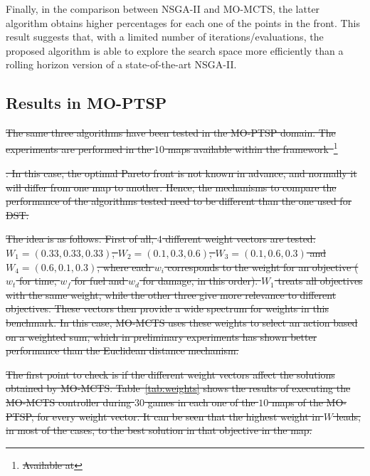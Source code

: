 \documentclass[journal]{IEEEtran}
\providecommand{\DIFdeltex}[1]{{\protect\color{red}\sout{#1}}}                      %
\providecommand{\DIFdelbegin}{} %
\providecommand{\DIFdel}[1]{\texorpdfstring{\DIFdeltex{#1}}{}} %
\begin{document}
Finally, in the comparison between NSGA-II and MO-MCTS, the latter algorithm obtains higher percentages for each one of the points in the front. This result suggests that, with a limited number of iterations/evaluations, the proposed algorithm is able to explore the search space more efficiently than a rolling horizon version of a state-of-the-art NSGA-II.


\subsection{Results in MO-PTSP} \label{ssec:resMOPTSP}

\DIFdelbegin \DIFdel{The same three algorithms have been tested in the MO-PTSP domain. The experiments are performed in the $10$ maps available within the framework~}\footnote{\DIFdel{Available at }%
}%
\addtocounter{footnote}{-1}%
\DIFdel{. In this case, the optimal Pareto front is not known in advance, and normally it will differ from one map to another. Hence, the mechanisms to compare the performance of the algorithms tested need to be different than the one used for DST.
}%

\DIFdel{The idea is as follows. First of all, $4$ different weight vectors are tested: $W_1 = (0.33,0.33,0.33)$, $W_2 = (0.1,0.3,0.6)$, $W_3 = (0.1,0.6,0.3)$ and $W_4 = (0.6,0.1,0.3)$, where each $w_i$ corresponds to the weight for an objective ($w_t$ for time, $w_f$ for fuel and $w_d$ for damage, in this order). $W_1$ treats all objectives with the same weight, while the other three give more relevance to different objectives. These vectors then provide a wide spectrum for weights in this benchmark. In this case, MO-MCTS uses these weights to select an action based on a weighted sum, which in preliminary experiments has shown better performance than the Euclidean distance mechanism.
}%

\DIFdel{The first point to check is if the different weight vectors affect the solutions obtained by MO-MCTS. Table~\ref{tab:weights} shows the results of executing the MO-MCTS controller during $30$ games in each one of the $10$ maps of the MO-PTSP, for every weight vector. It can be seen that the highest weight in $W$ leads, in most of the cases, to the best solution in that objective in the map. 
}%
\end{document}
